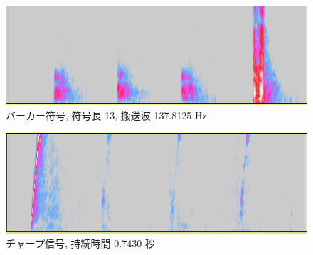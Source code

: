 \begin{figure}[p]
  \centering
  \includegraphics[clip,width=1.05\hsize]{img/barker_137-8125.png}
  \caption{バーカー符号, 符号長 13, 搬送波 137.8125 Hz}\label{fig:barkerZ137Z8125}
\end{figure}

\begin{figure}[p]
  \centering
  \includegraphics[clip,width=1.05\hsize]{img/chirp_32768.png}
  \caption{チャープ信号, 持続時間 0.7430 秒}\label{fig:chirpZ32768}
\end{figure}


